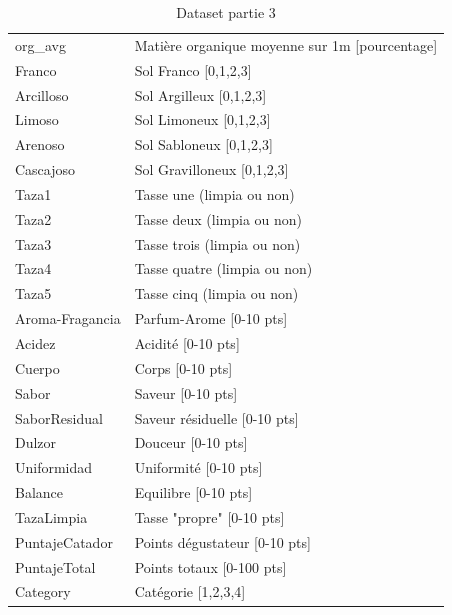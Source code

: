 \begin{table}[H]
\centering
\caption{Dataset partie 3}
\label{my-label}
\begin{tabular}{ll}
		org\_avg        & Matière organique moyenne sur 1m {[}pourcentage{]} \\
		Franco          & Sol Franco {[}0,1,2,3{]}                           \\
		Arcilloso       & Sol Argilleux {[}0,1,2,3{]}                        \\
		Limoso          & Sol Limoneux {[}0,1,2,3{]}                         \\
		Arenoso         & Sol Sabloneux {[}0,1,2,3{]}                        \\
		Cascajoso       & Sol Gravilloneux {[}0,1,2,3{]}                     \\
		Taza1           & Tasse une (limpia ou non)                          \\
		Taza2           & Tasse deux (limpia ou non)                         \\
		Taza3           & Tasse trois (limpia ou non)                        \\
		Taza4           & Tasse quatre (limpia ou non)                       \\
		Taza5           & Tasse cinq (limpia ou non)                         \\
		Aroma-Fragancia & Parfum-Arome {[}0-10 pts{]}                        \\
		Acidez          & Acidité {[}0-10 pts{]}                             \\
		Cuerpo          & Corps {[}0-10 pts{]}                               \\
		Sabor           & Saveur {[}0-10 pts{]}                              \\
		SaborResidual   & Saveur résiduelle {[}0-10 pts{]}                   \\
		Dulzor          & Douceur  {[}0-10 pts{]}                            \\
		Uniformidad     & Uniformité {[}0-10 pts{]}                          \\
		Balance         & Equilibre {[}0-10 pts{]}                           \\
		TazaLimpia      & Tasse "propre" {[}0-10 pts{]}                      \\
		PuntajeCatador  & Points dégustateur {[}0-10 pts{]}                  \\
		PuntajeTotal    & Points totaux {[}0-100 pts{]}                      \\
		Category        & Catégorie {[}1,2,3,4{]}                           
	\end{tabular}
\end{table}
 

